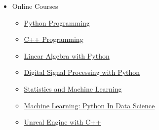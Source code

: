 \documentclass[10pt,a4paper,sans]{moderncv} %
\begin{document}
    \vspace{1em}
	\begin{itemize}
		
		\item[]  Online Courses
		
		\begin{multicols}{2}
			\begin{itemize}

				\item {} \href{https://www.udemy.com/course/master-python-programming-complete-python-bootcamp/}{Python Programming}

				\item {} \href{https://www.udemy.com/course/cpp-deep-dive/}{C++ Programming}

                \item {} \href{https://www.udemy.com/course/linear-algebra-theory-and-implementation/}{Linear Algebra with Python}

                \item {}  \href{https://www.udemy.com/course/python-scientific-x/}{Digital Signal Processing with Python}
				

                \item {}  \href{https://www.udemy.com/course/statsml_x/}{Statistics and Machine Learning}
				
				\item {} \href{https://www.udemy.com/course/machinelearning/}{Machine Learning: Python In Data Science}
				
				\item {} \href{https://www.udemy.com/course/unrealcourse/}{Unreal Engine with C++}
								
				
%				
%				
				

\end{itemize}
\end{multicols}
\end{itemize}
\end{document}
